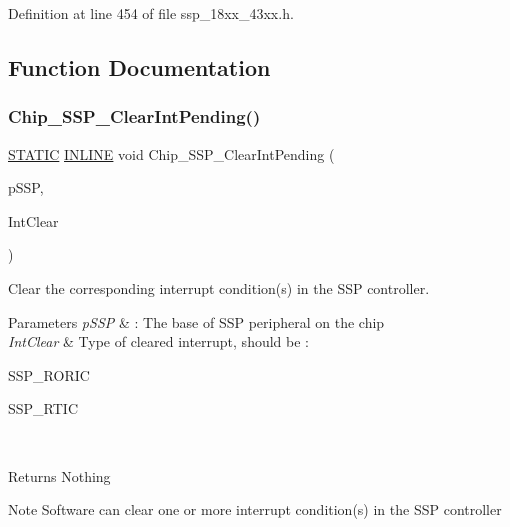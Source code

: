 Definition at line 454 of file ssp\+\_\+18xx\+\_\+43xx.\+h.



\subsection{Function Documentation}
\mbox{\label{group___s_s_p__18_x_x__43_x_x_ga5fe8047a36b3055251cff755d339ca4a}} 
\subsubsection{\texorpdfstring{Chip\+\_\+\+S\+S\+P\+\_\+\+Clear\+Int\+Pending()}{Chip\_SSP\_ClearIntPending()}}
{\footnotesize\ttfamily \hyperlink{group___l_p_c___types___public___macros_ga10b2d890d871e1489bb02b7e70d9bdfb}{S\+T\+A\+T\+IC} \hyperlink{spifi__18xx__43xx_8h_a2eb6f9e0395b47b8d5e3eeae4fe0c116}{I\+N\+L\+I\+NE} void Chip\+\_\+\+S\+S\+P\+\_\+\+Clear\+Int\+Pending (\begin{DoxyParamCaption}\item[{\hyperlink{struct_l_p_c___s_s_p___t}{L\+P\+C\+\_\+\+S\+S\+P\+\_\+T} $\ast$}]{p\+S\+SP,  }\item[{\hyperlink{group___s_s_p__18_x_x__43_x_x_gadc98b69a8cb7a5afef8dd81bebbfc66d}{S\+S\+P\+\_\+\+I\+N\+T\+C\+L\+E\+A\+R\+\_\+T}}]{Int\+Clear }\end{DoxyParamCaption})}



Clear the corresponding interrupt condition(s) in the S\+SP controller. 


\begin{DoxyParams}{Parameters}
{\em p\+S\+SP} & \+: The base of S\+SP peripheral on the chip \\
\hline
{\em Int\+Clear} & Type of cleared interrupt, should be \+:
\begin{DoxyItemize}
\item S\+S\+P\+\_\+\+R\+O\+R\+IC
\item S\+S\+P\+\_\+\+R\+T\+IC 
\end{DoxyItemize}\\
\hline
\end{DoxyParams}
\begin{DoxyReturn}{Returns}
Nothing 
\end{DoxyReturn}
\begin{DoxyNote}{Note}
Software can clear one or more interrupt condition(s) in the S\+SP controller 
\end{DoxyNote}


